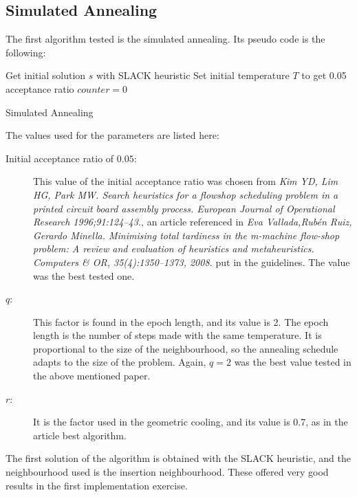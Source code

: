 \subsection{Simulated Annealing}
The first algorithm tested is the simulated annealing. Its pseudo code is the following:

\begin{algorithm}[H]
 Get initial solution $s$ with SLACK heuristic\;
 Set initial temperature $T$ to get 0.05 acceptance ratio\;
 $counter = 0$\;
 \caption{Simulated Annealing}
\end{algorithm}

The values used for the parameters are listed here:
\begin{description}
\item[Initial acceptance ratio of $0.05$:] This value of the initial acceptance ratio was chosen from \emph{Kim YD, Lim HG, Park MW. Search heuristics for a flowshop scheduling problem in a printed circuit board assembly process. European Journal
of Operational Research 1996;91:124–43.}, an article referenced in \emph{Eva Vallada,Rubén Ruiz, Gerardo Minella. Minimising total tardiness in the m-machine flow-shop problem: A review and evaluation of heuristics and metaheuristics. Computers \& OR, 35(4):1350–1373, 2008.} put in the guidelines. The value was the best tested one.

\item[$q$:] This factor is found in the epoch length, and its value is 2. The epoch length is the number of steps made with the same temperature. It is proportional to the size of the neighbourhood, so the annealing schedule adapts to the size of the problem. Again, $q = 2$ was the best value tested in the above mentioned paper.

\item[$r$:] It is the factor used in the geometric cooling, and its value is 0.7, as in the article best algorithm.
\end{description}

The first solution of the algorithm is obtained with the SLACK heuristic, and the neighbourhood used is the insertion neighbourhood. These offered very good results in the first implementation exercise.\\


